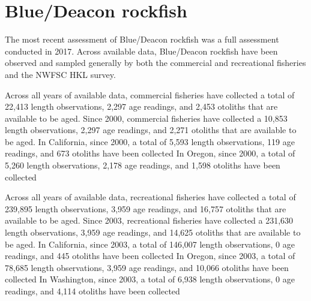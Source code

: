 \documentclass[11pt,
  english,
  letterpaper,
]{article}
\begin{document}

\hypertarget{bluedeacon-rockfish}{%
\section{Blue/Deacon rockfish}\label{bluedeacon-rockfish}}

\leavevmode\tagmcend\tagstructend


The most recent assessment of Blue/Deacon rockfish was a full assessment conducted in 2017. Across available data, Blue/Deacon rockfish have been observed and sampled generally by both the commercial and recreational fisheries and the NWFSC HKL survey.

\leavevmode\tagmcend\tagstructend\par


Across all years of available data, commercial fisheries have collected a total of 22,413 length observations, 2,297 age readings, and 2,453 otoliths that are available to be aged. Since 2000, commercial fisheries have collected a 10,853 length observations, 2,297 age readings, and 2,271 otoliths that are available to be aged. In California, since 2000, a total of 5,593 length observations, 119 age readings, and 673 otoliths have been collected In Oregon, since 2000, a total of 5,260 length observations, 2,178 age readings, and 1,598 otoliths have been collected

\leavevmode\tagmcend\tagstructend\par


Across all years of available data, recreational fisheries have collected a total of 239,895 length observations, 3,959 age readings, and 16,757 otoliths that are available to be aged. Since 2003, recreational fisheries have collected a 231,630 length observations, 3,959 age readings, and 14,625 otoliths that are available to be aged. In California, since 2003, a total of 146,007 length observations, 0 age readings, and 445 otoliths have been collected In Oregon, since 2003, a total of 78,685 length observations, 3,959 age readings, and 10,066 otoliths have been collected In Washington, since 2003, a total of 6,938 length observations, 0 age readings, and 4,114 otoliths have been collected

\leavevmode\tagmcend\tagstructend\par
\end{document}
